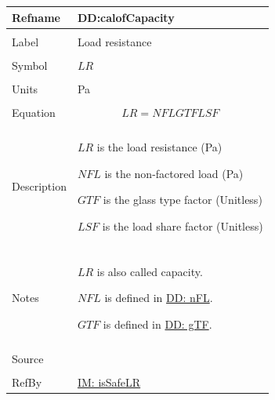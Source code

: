 \documentclass[12pt]{article}
\begin{document}
\vspace{\baselineskip}
\noindent
\begin{minipage}{\textwidth}
\begin{tabular}{>{\raggedright}p{}>{\raggedright\arraybackslash}p{}}
\toprule \textbf{Refname} & \textbf{DD:calofCapacity}
\label{DD:calofCapacity}
\\ \midrule \\
Label & Load resistance
        
\\ \midrule \\
Symbol & $LR$
         
\\ \midrule \\
Units & Pa
        
\\ \midrule \\
Equation & \begin{displaymath}
           LR=NFL GTF LSF
           \end{displaymath}
\\ \midrule \\
Description & \begin{symbDescription}
              \item{$LR$ is the load resistance (Pa)}
              \item{$NFL$ is the non-factored load (Pa)}
              \item{$GTF$ is the glass type factor (Unitless)}
              \item{$LSF$ is the load share factor (Unitless)}
              \end{symbDescription}
\\ \midrule \\
Notes & $LR$ is also called capacity.
        
        $NFL$ is defined in \hyperref[DD:nFL]{DD: nFL}.
        
        $GTF$ is defined in \hyperref[DD:gTF]{DD: gTF}.
        
\\ \midrule \\
Source & \cite{astm2009}
         
\\ \midrule \\
RefBy & \hyperref[IM:isSafeLR]{IM: isSafeLR}
        
\\ \bottomrule
\end{tabular}
\end{minipage}
\end{document}
